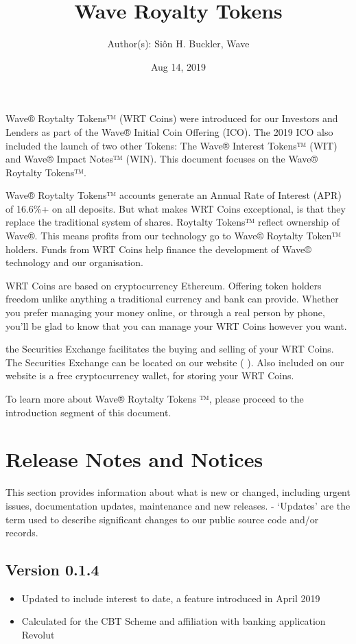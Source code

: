 \documentclass[letterpaper,10pt,openany,oneside,english]{sphinxmanual}
\title{Wave Royalty Tokens}
\date{Aug 14, 2019}
\author{Author(s): Siôn H. Buckler, Wave}
\begin{document}
\maketitle
\sphinxtableofcontents
{}\label{\detokenize{index::doc}}


Wave® Roytalty Tokens™ (WRT Coins) were introduced for our Investors and Lenders as part of the Wave® Initial Coin Offering (ICO).
The 2019 ICO also included the launch of two other Tokens: The Wave® Interest Tokens™ (WIT) and Wave® Impact Notes™ (WIN).
This document focuses on the Wave® Roytalty Tokens™.

Wave® Roytalty Tokens™ accounts generate an Annual Rate of Interest (APR) of 16.6\%+ on all deposits.
But what makes WRT Coins exceptional, is that they replace the traditional system of shares.
Roytalty Tokens™ reflect ownership of Wave®. This means profits from our technology go to Wave® Roytalty Token™ holders.
Funds from WRT Coins help finance the development of Wave® technology and our organisation.

WRT Coins are based on cryptocurrency Ethereum. Offering token holders freedom unlike anything a traditional currency and bank can provide.
Whether you prefer managing your money online, or through a real person by phone, you’ll be glad to know that you can manage your WRT Coins however you want.

the Securities Exchange facilitates the buying and selling of your WRT Coins.
The Securities Exchange can be located on our website (  ).
Also included on our website is a free cryptocurrency wallet, for storing your WRT Coins.

To learn more about Wave® Roytalty Tokens ™, please proceed to the introduction segment of this document.


\chapter{Release Notes and Notices}
\label{\detokenize{releasenotes:release-notes-and-notices}}\label{\detokenize{releasenotes::doc}}
This section provides information about what is new or changed, including urgent issues, documentation updates, maintenance and new releases.
- ‘Updates’ are the term used to describe significant changes to our public source code and/or records.


\section{Version 0.1.4}
\label{\detokenize{releasenotes:version-0-1-4}}\begin{itemize}
\item {} 
Updated to include interest to date, a feature introduced in April 2019

\item {} 
Calculated for the CBT Scheme and affiliation with banking application Revolut

\end{itemize}
\end{document}
